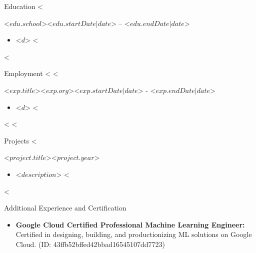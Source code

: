 \documentclass[]{mcdowellcv}
\begin{document}
	\makeheader
	

	\begin{cvsection}{Education}
		<%
		\begin{cvsubsection}{<$ edu.school $>}{}{<$ edu.startDate | date $> -- <$ edu.endDate | date $>}
			\begin{itemize}
					<%
				\item <$ d $>
					<%
			\end{itemize}
		\end{cvsubsection}
		<%
	\end{cvsection}

	\begin{cvsection}{Employment}
		<%
		<%
		\begin{cvsubsection}{<$ exp.title $>}{<$ exp.org $>}{<$ exp.startDate | date $> - <$ exp.endDate | date $>}
			\begin{itemize}
			<%
				\item <$ d $>
			<%
			\end{itemize}
		\end{cvsubsection}
		<%
		<%
	\end{cvsection}
		
    \begin{cvsection}{Projects}
	<%
        \begin{cvsubsection}{<$ project.title $>}{}{<$ project.year $>}
            \begin{itemize}
		<%
		\item  <$ description $>
		<%
            \end{itemize}
        \end{cvsubsection}
	<%
	\end{cvsection}

	\begin{cvsection}{Additional Experience and Certification}
		\begin{cvsubsection}{}{}{}	
			\begin{itemize}
				\item \textbf{Google Cloud Certified Professional Machine Learning Engineer:} Certified in designing, building, and productionizing ML solutions on Google Cloud. (ID: 43ffb52bffed42bbad16545107dd7723)
			\end{itemize}
		\end{cvsubsection}
	\end{cvsection}
	
\end{document}
